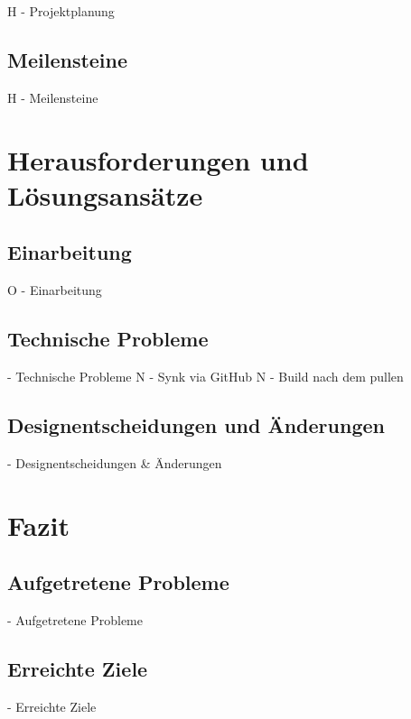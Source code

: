 \documentclass[oneside]{ausarbeitung}
\begin{document}
H - Projektplanung


\section{Meilensteine}

H - Meilensteine



\chapter{Herausforderungen und Lösungsansätze}

\section{Einarbeitung}

O - Einarbeitung


\section{Technische Probleme}

  - Technische Probleme
N   - Synk via GitHub
N   - Build nach dem pullen


\section{Designentscheidungen und Änderungen}

  - Designentscheidungen & Änderungen


\chapter{Fazit}

\section{Aufgetretene Probleme}

  - Aufgetretene Probleme


\section{Erreichte Ziele}

  - Erreichte Ziele
\end{document}
